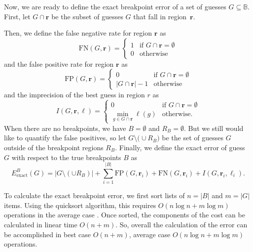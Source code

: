 \documentclass{jsfds} %
\renewcommand{\r}{ \mathbf{ r} }
\begin{document}
Now, we are ready to define the exact breakpoint error of a set of
guesses $G\subseteq\mathbb B$.
First, let $G \cap\r$ be the subset of guesses $G$ that fall in
region~$\r$. 

Then, we define the false negative rate for region $\r$ as 
\begin{equation}
  \label{eq:FN_i}
  \text{FN}(G,\r) = 
  \begin{cases}
    1 & \text{if } G\cap\r = \emptyset\\
    0 & \text{otherwise}
  \end{cases}
\end{equation}
and the false positive rate for region $\r$ as
\begin{equation}
  \label{eq:FP_i}
  \text{FP}(G,\r) =
  \begin{cases}
    0 & \text{if }G\cap\r = \emptyset\\
    |G\cap\r|-1 &\text{otherwise}
  \end{cases}
\end{equation}
and the imprecision of the best guess in region $r$ as
\begin{equation}
  \label{eq:imprecision}
  I(G,\r,\ell) =
  \begin{cases}
    0 & \text{if } G\cap\r = \emptyset\\
    \min_{g\in G\cap\r} \ell(g) & \text{otherwise}.
  \end{cases}
\end{equation}
When there are no breakpoints, we have $B=\emptyset$ and
$R_B=\emptyset$. But we still would like to quantify the false
positives, so let $G\setminus\big( \cup R_B\big) $ be the set of
guesses $G$ outside of the breakpoint regions $R_B$. Finally, we
define the exact error of guess $G$ with respect to the true
breakpoints $B$ as
\begin{equation}
  \label{eq:exact_breakpoint_cost}
  {E }_{\text{exact}}^B(G) =
  \big|G\setminus(\cup R_B)\big|
 + \sum_{i=1}^{|B|}\text{FP}(G,\r_i)+\text{FN}(G,\r_i)+I(G,\r_i,\ell_i).
\end{equation}

\newpage

To calculate the exact breakpoint error, we first sort lists of
$n=|B|$ and $m=|G|$ items. Using the quicksort algorithm, this
requires $O(n\log n + m\log m)$ operations in the average case
\citep{clrs}. Once sorted, the components of the cost can be
calculated in linear time $O(n + m)$. So, overall the calculation of
the error can be accomplished in best case $O(n + m)$, average case
$O(n\log n + m\log m)$ operations.
\end{document}
